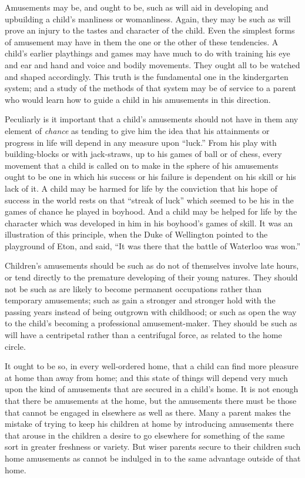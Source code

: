 \documentclass[
]{book}
\begin{document}
Amusements may be, and ought to be, such as will aid in developing and upbuilding a child's manliness or womanliness. Again, they may be such as will prove an injury to the tastes and character of the child. Even the simplest forms of amusement may have in them the one or the other of these tendencies. A child's earlier playthings and games may have much to do with training his eye and ear and hand and voice and bodily movements. They ought all to be watched and shaped accordingly. This truth is the fundamental one in the kindergarten system; and a study of the methods of that system may be of service to a parent who would learn how to guide a child in his amusements in this direction.

Peculiarly is it important that a child's amusements should not have in them any element of \emph{chance} as tending to give him the idea that his attainments or progress in life will depend in any measure upon ``luck.'' From his play with building-blocks or with jack-straws, up to his games of ball or of chess, every movement that a child is called on to make in the sphere of his amusements ought to be one in which his success or his failure is dependent on his skill or his lack of it. A child may be harmed for life by the conviction that his hope of success in the world rests on that ``streak of luck'' which seemed to be his in the games of chance he played in boyhood. And a child may be helped for life by the character which was developed in him in his boyhood's games of skill. It was an illustration of this principle, when the Duke of Wellington pointed to the playground of Eton, and said, ``It was there that the battle of Waterloo was won.''

Children's amusements should be such as do not of themselves involve late hours, or tend directly to the premature developing of their young natures. They should not be such as are likely to become permanent occupations rather than temporary amusements; such as gain a stronger and stronger hold with the passing years instead of being outgrown with childhood; or such as open the way to the child's becoming a professional amusement-maker. They should be such as will have a centripetal rather than a centrifugal force, as related to the home circle.

It ought to be so, in every well-ordered home, that a child can find more pleasure at home than away from home; and this state of things will depend very much upon the kind of amusements that are secured in a child's home. It is not enough that there be amusements at the home, but the amusements there must be those that cannot be engaged in elsewhere as well as there. Many a parent makes the mistake of trying to keep his children at home by introducing amusements there that arouse in the children a desire to go elsewhere for something of the same sort in greater freshness or variety. But wiser parents secure to their children such home amusements as cannot be indulged in to the same advantage outside of that home.
\end{document}
